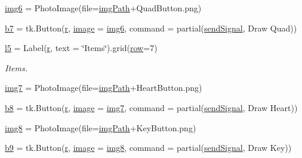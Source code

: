 \begin{DoxyCompactItemize}
\item 
\mbox{\hyperlink{namespace_g_u_i_a6cb0dc882c4030753831044192cbef73}{img6}} = Photo\+Image(file=\mbox{\hyperlink{namespace_g_u_i_a293e22c0a27a45862ad50fcb8ed12f15}{img\+Path}}+\textquotesingle{}Quad\+Button.\+png\textquotesingle{})
\item 
\mbox{\hyperlink{namespace_g_u_i_a2b170b4727c7ee7938399888e449e39b}{b7}} = tk.\+Button(\mbox{\hyperlink{_s_d_l__opengl_8h_a42ce7cdc612e53abee15043f80220d97}{r}}, \mbox{\hyperlink{_s_d_l__opengl_8h_a0a221b005894579fea3b9eb7bfc2ee71}{image}} = \mbox{\hyperlink{namespace_g_u_i_a6cb0dc882c4030753831044192cbef73}{img6}}, command = partial(\mbox{\hyperlink{namespace_g_u_i_ae82f740e6453cdd542b52ede1560c2c3}{send\+Signal}}, \textquotesingle{}Draw Quad\textquotesingle{}))
\item 
\mbox{\hyperlink{namespace_g_u_i_af4d553e4d64242f914c988b9b5cb6c88}{l5}} = Label(\mbox{\hyperlink{_s_d_l__opengl_8h_a42ce7cdc612e53abee15043f80220d97}{r}}, text = \char`\"{}Items\char`\"{}).grid(\mbox{\hyperlink{_s_d_l__opengl__glext_8h_a90d3e7e4182a9630993f640fa0443b0b}{row}}=7)
\begin{DoxyCompactList}\small\item\em Items. \end{DoxyCompactList}\item 
\mbox{\hyperlink{namespace_g_u_i_ab8b458d392f9b3d983f3d09b8eadf226}{img7}} = Photo\+Image(file=\mbox{\hyperlink{namespace_g_u_i_a293e22c0a27a45862ad50fcb8ed12f15}{img\+Path}}+\textquotesingle{}Heart\+Button.\+png\textquotesingle{})
\item 
\mbox{\hyperlink{namespace_g_u_i_a75a5a8fdd144311f4409de4a0dcfd143}{b8}} = tk.\+Button(\mbox{\hyperlink{_s_d_l__opengl_8h_a42ce7cdc612e53abee15043f80220d97}{r}}, \mbox{\hyperlink{_s_d_l__opengl_8h_a0a221b005894579fea3b9eb7bfc2ee71}{image}} = \mbox{\hyperlink{namespace_g_u_i_ab8b458d392f9b3d983f3d09b8eadf226}{img7}}, command = partial(\mbox{\hyperlink{namespace_g_u_i_ae82f740e6453cdd542b52ede1560c2c3}{send\+Signal}}, \textquotesingle{}Draw Heart\textquotesingle{}))
\item 
\mbox{\hyperlink{namespace_g_u_i_a16cb8d3ad11106b26025ddbf102b8a6f}{img8}} = Photo\+Image(file=\mbox{\hyperlink{namespace_g_u_i_a293e22c0a27a45862ad50fcb8ed12f15}{img\+Path}}+\textquotesingle{}Key\+Button.\+png\textquotesingle{})
\item 
\mbox{\hyperlink{namespace_g_u_i_ad8ee1e3aaa566c9c531afb653646940f}{b9}} = tk.\+Button(\mbox{\hyperlink{_s_d_l__opengl_8h_a42ce7cdc612e53abee15043f80220d97}{r}}, \mbox{\hyperlink{_s_d_l__opengl_8h_a0a221b005894579fea3b9eb7bfc2ee71}{image}} = \mbox{\hyperlink{namespace_g_u_i_a16cb8d3ad11106b26025ddbf102b8a6f}{img8}}, command = partial(\mbox{\hyperlink{namespace_g_u_i_ae82f740e6453cdd542b52ede1560c2c3}{send\+Signal}}, \textquotesingle{}Draw Key\textquotesingle{}))

\end{DoxyCompactItemize}
